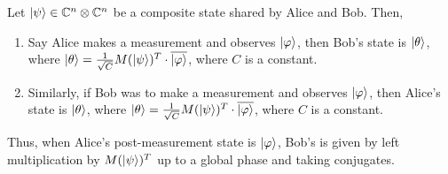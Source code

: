 \begin{lemma}
\label{end state lemma}
Let $\ket{\psi} \in \mathbb{C}^n \otimes \mathbb{C}^{n}$ be a composite state shared by Alice and Bob.  Then,
\begin{enumerate}
\item Say Alice makes a measurement and observes $\ket{\varphi}$, then Bob's state is $\ket{\theta}$, where $\ket{\theta}=\frac{1}{\sqrt{C}}M(\ket{\psi})^T \cdot \overline{\ket{\varphi}}$, where $C$ is a constant.
\item Similarly, if Bob was to make a measurement and observes $\ket{\varphi}$, then Alice's state is $\ket{\theta}$, where $\ket{\theta}=\frac{1}{\sqrt{C}}M(\ket{\psi})^T\cdot \overline{\ket{\varphi}}$, where $C$ is a constant.\\

\end{enumerate}
\end{lemma}

Thus, when Alice's post-measurement state is $\ket{\varphi}$, Bob's is given by left multiplication by $M(\ket{\psi})^T$ up to a global phase and taking conjugates.


